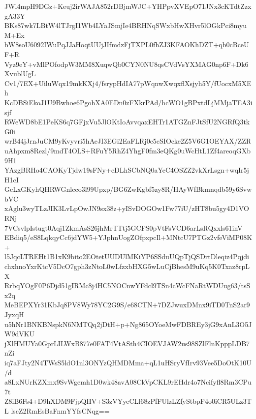JWl4mpH9DGz+Keuj2irWAJA852rDBjmWJC+YHPpvXVEpO71JNx3cKTdtZzxgA33Y
BKs87wk7LBtW4lTJrgI1Wb4LYaJSmjIe4BRHNqSWxbHwXHvr5lOGkPci8myuM+Ex
bW8soU6092IWuPqJJaHoqtUUjJIfmdzFjTXPL0fhZJ3KFAOKhDZT+qb0cBceUF+R
Vyz9eY+vMlPOfodpW3MM8XuqwQb0CYN0NU8qsCVdVsYXMAG0np6F+Dk6XvublUgL
Cv1/7EX+UiluWqx19mkKXj4/fsrypHdIA77pWqnwXwqxflXsjyh5Y/fUocxM5XEh
KcDBSiEkoJ1U9Bwhoe6PgohXA0EDn0zFXkrPAd/hcWO1gBPxtdLjMMjaTEA3isjf
RWeWD8bE1PeKS6q7GFjxVu5JlOKtIoAvvqaxEHTr1ATGZnFJtSfU2NGRfQ3tkG0i
wrB44jJrnJuCM9yKvyvri5hAeJI3EGi2EaFLRj0e5cSIOcke2Z5V6G1OEYAX/ZZR
uAhpxm8Rezl/9mdT4OLS+RFuY5RhZ4YhgF0fm3eQKg0uWcHtL1Zf4areoqGXb9H1
YAzgBRHo4CAOKyTjdw19sFNy+eDLhSCbNQ0aYeC4OSZZ2vkXrLsgn+wqIr5jH1cI
GcLxGKyhQHRWGnlcco3l99Upxp/BG6ZwKgbf5zy8R/HAyWfBkmnqdb59y6SvwbVC
xAglu3wyTLzJIK3LvLpOwJN9sx38z+yISvDOGOw1Fw77iU/zHT8bu5gy4D1VORNj
7VCsvlpIstugt0Aqj1ZkmAsS26jhMrTTtj5GCFS0pVtFsVCD6arLsRQxxls61inV
EBdiq5/eS8LqkqyCc6jdYW5+YJphnUogZOfpxpcIl+MNtcU7PTGz2vfeViMP08K+
l5JqcLTREHt1B1xK9bito2EOtetUUDUlMKiYP6SSduUQpTjQSDrtDleqiz4Pqjdi
chxhnoYxrKtcV5DcO7gph3zNtoL0wLfzxbHXG5wLuCjBhesM9uKq5K0Txaz8rpLX
RrbqYOgF0P6Djd51gIRMc8j4HC5NOCnwYFdcl9TSn4cWcFNaRtWDUug63/tsSx2q
MeBEPXYr31KbJq8PV8Wy78YC2G9S/e68CTN+7DZJwuxDMnx9iTD0TnS2ar9JyxqH
u5hNr1BNKBNspkN6NMTQq2jDtH+p+Ng865OYoeMwFDBREy3jG9xAnL3O5JW9dVKU
jXlHMUYa0GprLILWxB877e0FAT4VtASth4CIOEVJAW2us98SZlFlnKpppLDB7nZi
iq7aFJty2N4TWsS5ldO1nl3ONYzQHMDMma+qL1uHSryVfIrv93Vee5DoOtK10U/d
a8LxNUrKZXmx9SvWgemh1D0wk48avA08CkVpCKL9rEHdr4o7Ncifyfl8Rm3CPu7t
Z8iB6Fs4+D9hXDM9FjpQHV+S3zVYyeCLl68zPfFUlzLZfyStbpF4o0iCR5ULz3TL
lscZ2RmEsBaFnmYYfsCNqg==
